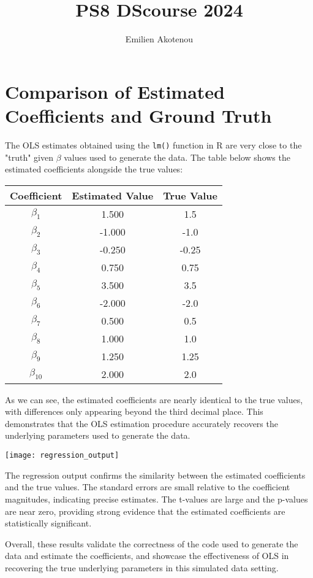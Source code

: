 \documentclass{article}
\title{PS8 DScourse 2024}
\author{Emilien Akotenou}
\begin{document}
\maketitle




\section{Comparison of Estimated Coefficients and Ground Truth}

The OLS estimates obtained using the \texttt{lm()} function in R are very close to the "truth"  given $\beta$ values used to generate the data. The table below shows the estimated coefficients alongside the true values:

\begin{center}
\begin{tabular}{ccc}
\hline
Coefficient & Estimated Value & True Value \\
\hline
$\beta_1$ & 1.500 & 1.5 \\
$\beta_2$ & -1.000 & -1.0 \\
$\beta_3$ & -0.250 & -0.25 \\
$\beta_4$ & 0.750 & 0.75 \\
$\beta_5$ & 3.500 & 3.5 \\
$\beta_6$ & -2.000 & -2.0 \\
$\beta_7$ & 0.500 & 0.5 \\
$\beta_8$ & 1.000 & 1.0 \\
$\beta_9$ & 1.250 & 1.25 \\
$\beta_{10}$ & 2.000 & 2.0 \\
\hline
\end{tabular}
\end{center}

As we can see, the estimated coefficients are nearly identical to the true values, with differences only appearing beyond the third decimal place. This demonstrates that the OLS estimation procedure accurately recovers the underlying parameters used to generate the data.

\texttt{[image: regression\_output]}

The regression output confirms the similarity between the estimated coefficients and the true values. The standard errors are small relative to the coefficient magnitudes, indicating precise estimates. The t-values are large and the p-values are near zero, providing strong evidence that the estimated coefficients are statistically significant.

Overall, these results validate the correctness of the code used to generate the data and estimate the coefficients, and showcase the effectiveness of OLS in recovering the true underlying parameters in this simulated data setting.
\end{document}
